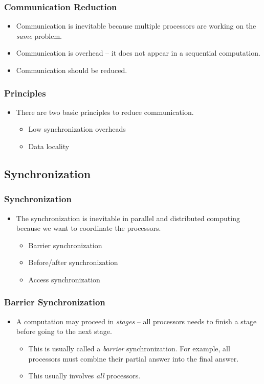 \documentclass{beamer}
\begin{document}
\begin{CJK}{UTF8}{bsmi}
\begin{frame}
\frametitle{Communication Reduction}
\begin{itemize}
\item Communication is inevitable because multiple processors are
  working on the {\em same} problem.
\item Communication is overhead -- it does not appear in a sequential
  computation.
\item Communication should be reduced.
\end{itemize}
\end{frame}

\begin{frame}
\frametitle{Principles}
\begin{itemize}
\item There are two basic principles to reduce communication.
\begin{itemize}
\item Low synchronization overheads
\item Data locality
\end{itemize}
\end{itemize}
\end{frame}

\subsection{Synchronization}

\begin{frame}
\frametitle{Synchronization}
\begin{itemize}
\item The synchronization is inevitable in parallel and distributed
  computing because we want to coordinate the processors.
\begin{itemize}
\item Barrier synchronization
\item Before/after synchronization
\item Access synchronization
\end{itemize}
\end{itemize}
\end{frame}


\begin{frame}
\frametitle{Barrier Synchronization}
\begin{itemize}
\item A computation may proceed in {\em stages} -- all processors
  needs to finish a stage before going to the next stage.
\begin{itemize}
\item This is usually called a {\em barrier} synchronization.  For
  example, all processors must combine their partial answer into the
  final answer.
\item This usually involves {\em all} processors.
\end{itemize}
\end{itemize}
\end{frame}


\end{CJK}
\end{document}

